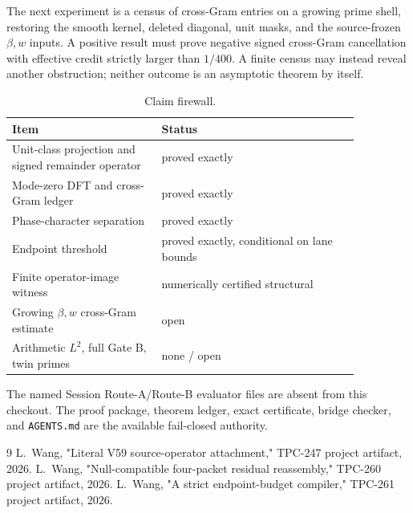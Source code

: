 \documentclass[11pt]{article}
\begin{document}
The next experiment is a census of cross-Gram entries on a growing prime
shell, restoring the smooth kernel, deleted diagonal, unit masks, and the
source-frozen \(\beta,w\) inputs.  A positive result must prove negative
signed cross-Gram cancellation with effective credit strictly larger than
\(1/400\).  A finite census may instead reveal another obstruction; neither
outcome is an asymptotic theorem by itself.

\begin{table}[b]
\centering
\caption{Claim firewall.}
\begin{tabular}{p{0.37\linewidth}p{0.49\linewidth}}
\toprule
Item & Status\\
\midrule
Unit-class projection and signed remainder operator & proved exactly\\
Mode-zero DFT and cross-Gram ledger & proved exactly\\
Phase-character separation & proved exactly\\
Endpoint threshold & proved exactly, conditional on lane bounds\\
Finite operator-image witness & numerically certified structural\\
Growing \(\beta,w\) cross-Gram estimate & open\\
Arithmetic \(L^2\), full Gate B, twin primes & none / open\\
\bottomrule
\end{tabular}
\end{table}

The named Session Route-A/Route-B evaluator files are absent from this
checkout.  The proof package, theorem ledger, exact certificate, bridge
checker, and \texttt{AGENTS.md} are the available fail-closed authority.

\begin{thebibliography}{9}
 L.~Wang, "Literal V59 source-operator attachment,"
TPC-247 project artifact, 2026.
 L.~Wang, "Null-compatible four-packet residual
reassembly," TPC-260 project artifact, 2026.
 L.~Wang, "A strict endpoint-budget compiler,"
TPC-261 project artifact, 2026.
\end{thebibliography}
\end{document}
